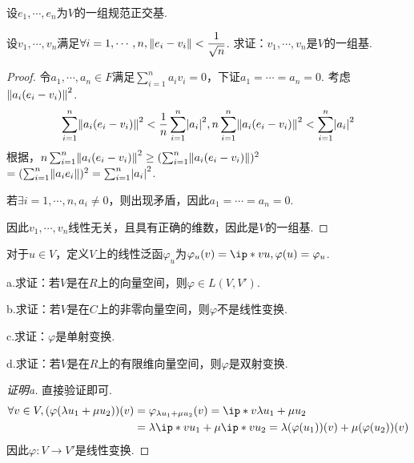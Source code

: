 \begin{problem}[14]\label{6.B.14}
    设\(e_1,\cdots,e_n\)为\(V\)的一组规范正交基.

    设\(v_1,\cdots,v_n\)满足\(\forall i=1,\cdots,n,\norm*{e_i-v_i}<\dfrac{1}{\sqrt{n}}\).
    求证：\(v_1,\cdots,v_n\)是\(V\)的一组基.
\end{problem}

\begin{proof}
    令\(a_1,\cdots,a_n \in F\)满足\(\sum_{i=1}^n a_iv_i=0\)，下证\(a_1=\cdots=a_n=0\).
    考虑\(\norm*{a_i(e_i-v_i)}^2\).
    \begin{align*}
        \sum_{i=1}^n \norm*{a_i(e_i-v_i)}^2<\dfrac{1}{n}\sum_{i=1}^n \abs*{a_i}^2,
        n\sum_{i=1}^n \norm*{a_i(e_i-v_i)}^2<\sum_{i=1}^n \abs*{a_i}^2
    \end{align*}
    根据，\(n\sum_{i=1}^n \norm*{a_i(e_i-v_i)}^2 \geq (\sum_{i=1}^n \norm*{a_i(e_i-v_i)})^2\)
    \(=(\sum_{i=1}^n \norm*{a_ie_i})^2=\sum_{i=1}^n \abs*{a_i}^2\).
    
    若\(\exists i=1,\cdots,n,a_i \ne 0\)，则出现矛盾，因此\(a_1=\cdots=a_n=0\).
    
    因此\(v_1,\cdots,v_n\)线性无关，且具有正确的维数，因此是\(V\)的一组基.
\end{proof}

\newpage

\begin{problem}[17]\label{6.B.17}
    对于\(u \in V\)，定义\(V\)上的线性泛函\(\varphi_u\)为\(\varphi_u(v)=\ip*{v}{u},\varphi(u)=\varphi_u\).

    a.求证：若\(V\)是在\(R\)上的向量空间，则\(\varphi \in L(V,V')\).
    
    b.求证：若\(V\)是在\(C\)上的非零向量空间，则\(\varphi\)不是线性变换.
    
    c.求证：\(\varphi\)是单射变换.
    
    d.求证：若\(V\)是在\(R\)上的有限维向量空间，则\(\varphi\)是双射变换.
\end{problem}

\begin{proof}[证明a]
    直接验证即可.
    \begin{align*}
        \forall v \in V,(\varphi(\lambda u_1+\mu u_2))(v)
        &=\varphi_{\lambda u_1+\mu u_2}(v)=\ip*{v}{\lambda u_1+\mu u_2} \\
        &=\lambda \ip*{v}{u_1}+\mu \ip*{v}{u_2}=\lambda (\varphi(u_1))(v)+\mu (\varphi(u_2))(v)
    \end{align*}
    因此\(\varphi:V \rightarrow V'\)是线性变换.
\end{proof}

